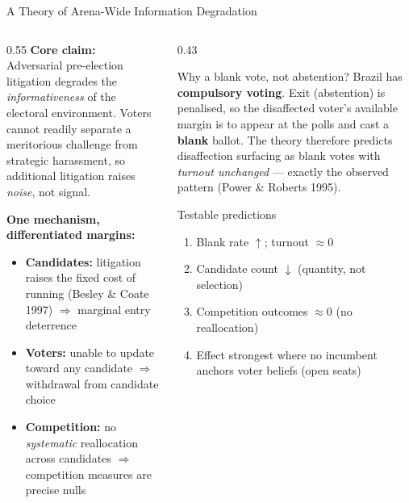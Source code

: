 \documentclass[aspectratio=169,10pt]{beamer}
\begin{document}
\begin{frame}{A Theory of Arena-Wide Information Degradation}
\begin{columns}[T]
\begin{column}{0.55\textwidth}
\textbf{Core claim:}\\
Adversarial pre-election litigation degrades the \emph{informativeness} of the electoral environment. Voters cannot readily separate a meritorious challenge from strategic harassment, so additional litigation raises \emph{noise}, not signal.
\bigskip

\textbf{One mechanism, differentiated margins:}
\begin{itemize}
  \item \textbf{Candidates:} litigation raises the fixed cost of running (Besley \& Coate 1997) $\Rightarrow$ marginal entry deterrence
  \item \textbf{Voters:} unable to update toward any candidate $\Rightarrow$ withdrawal from candidate choice
  \item \textbf{Competition:} no \emph{systematic} reallocation across candidates $\Rightarrow$ competition measures are precise nulls
\end{itemize}
\end{column}
\begin{column}{0.43\textwidth}
\begin{alertblock}{Why a blank vote, not abstention?}
  \footnotesize
  Brazil has \textbf{compulsory voting}. Exit (abstention) is penalised, so the disaffected voter's available margin is to appear at the polls and cast a \textbf{blank} ballot. The theory therefore predicts disaffection surfacing as blank votes with \emph{turnout unchanged} --- exactly the observed pattern (Power \& Roberts 1995).
\end{alertblock}
\medskip
\begin{block}{Testable predictions}
  \footnotesize
  \begin{enumerate}
    \item Blank rate $\uparrow$; turnout $\approx 0$
    \item Candidate count $\downarrow$ (quantity, not selection)
    \item Competition outcomes $\approx 0$ (no reallocation)
    \item Effect strongest where no incumbent anchors voter beliefs (open seats)
  \end{enumerate}
\end{block}
\end{column}
\end{columns}
\end{frame}
\end{document}
